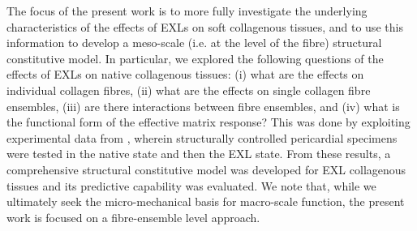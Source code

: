     
    The focus of the present work is to more fully investigate the underlying characteristics of the effects of EXLs on soft collagenous tissues, and to use this information to develop a meso-scale (i.e. at the level of the fibre) structural constitutive model. In particular, we explored the following questions of the effects of EXLs on native collagenous tissues: (i) what are the effects on individual collagen fibres, (ii) what are the effects on single collagen fibre ensembles, (iii) are there interactions between fibre ensembles, and (iv) what is the functional form of the effective matrix response? This was done by exploiting experimental data from \cite{sun_biaxial_2003}, wherein structurally controlled pericardial specimens were tested in the native state and then the EXL state. From these results, a comprehensive structural constitutive model was developed for EXL collagenous tissues and its predictive capability was evaluated. We note that, while we ultimately seek the micro-mechanical basis for macro-scale function, the present work is focused on a fibre-ensemble level approach.
    
    
    

